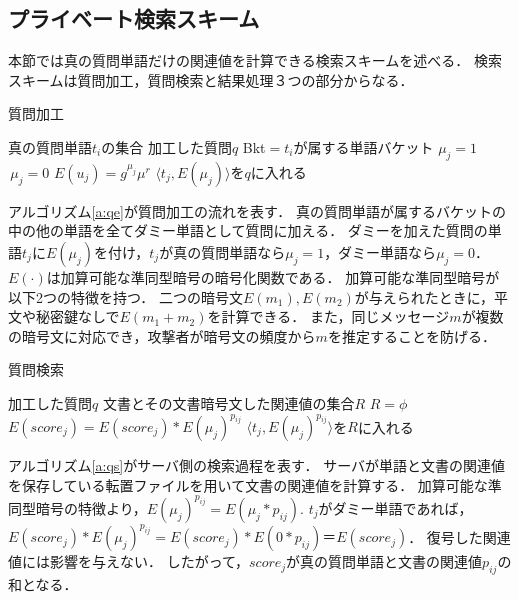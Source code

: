 \documentclass[master]{suribt}
\theoremstyle{definition}
\begin{document}
 \subsection{プライベート検索スキーム}
 本節では真の質問単語だけの関連値を計算できる検索スキームを述べる．
 検索スキームは質問加工，質問検索と結果処理３つの部分からなる．

 \begin{algorithm}
 \caption{質問加工}
 \begin{algorithmic}[1]
  \Require 真の質問単語$t_i$の集合
  \Ensure 加工した質問$q$
   \State Bkt$=t_i$が属する単語バケット
     $\mu_j=1$
    \Else $\,\mu_j=0$
    \EndIf
    \State $E(u_j) = g^{\mu_j}\mu^r$
    \State $\langle t_j,E(\mu_j)\rangle$を$q$に入れる
   \EndFor
  \EndFor
 \EndFunction
 \end{algorithmic}
 \label{a:qe}
 \end{algorithm}

 アルゴリズム\ref{a:qe}が質問加工の流れを表す．
 真の質問単語が属するバケットの中の他の単語を全てダミー単語として質問に加える．
 ダミーを加えた質問の単語$t_j$に$E(\mu_j)$を付け，$t_j$が真の質問単語なら$\mu_j=1$，ダミー単語なら$\mu_j=0$．
 $E(\cdot)$は加算可能な準同型暗号\cite{dpe1994}の暗号化関数である．
 加算可能な準同型暗号が以下2つの特徴を持つ．
 二つの暗号文$E(m_1), E(m_2)$が与えられたときに，平文や秘密鍵なしで$E( m_1 + m_2 )$を計算できる．
 また，同じメッセージ$m$が複数の暗号文に対応でき，攻撃者が暗号文の頻度から$m$を推定することを防げる．

 \begin{algorithm}
 \caption{質問検索}
 \begin{algorithmic}[1]
  \Require 加工した質問$q$
  \Ensure 文書とその文書暗号文した関連値の集合$R$
  \State $R=\phi$
     \State $E(score_j)=E(score_j)*E(\mu_j)^{p_{ij}}$
    \Else
     \State $\langle t_j,E(\mu_j)^{p_{ij}}\rangle$を$R$に入れる
    \EndIf
   \EndFor
  \EndFor
 \EndFunction
 \end{algorithmic}
 \label{a:qs}
 \end{algorithm}

 アルゴリズム\ref{a:qs}がサーバ側の検索過程を表す．
 サーバが単語と文書の関連値を保存している転置ファイルを用いて文書の関連値を計算する．
 加算可能な準同型暗号の特徴より，$E(\mu_j)^{p_{ij}}=E(\mu_j*p_{ij})$.
 $t_j$がダミー単語であれば，$E(score_j)*E(\mu_j)^{p_{ij}}=E(score_j)*E(0*p_{ij})＝E(score_j)$．
 復号した関連値には影響を与えない．
 したがって，$score_j$が真の質問単語と文書の関連値$p_{ij}$の和となる．
\end{document}
